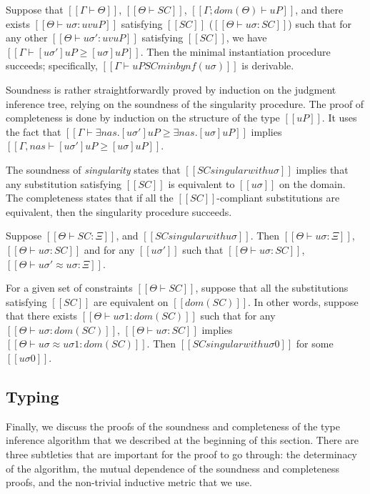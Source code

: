 \begin{lemma*}
    Suppose that $[[Γ ⊢ Θ]]$, $[[Θ ⊢ SC]]$, $[[Γ; dom(Θ) ⊢ uP]]$, and there exists 
    $[[Θ ⊢ uσ : uv uP ]]$ satisfying $[[SC]]$ ($[[Θ ⊢ uσ : SC]]$) 
    such that for any other $[[Θ ⊢ uσ' : uv uP ]]$
    satisfying $[[SC]]$, we have
    $[[Γ ⊢ [uσ']uP ≥ [uσ]uP ]]$.  Then the minimal instantiation procedure  
    succeeds; specifically, $[[Γ ⊢ uP SC minby nf(uσ) ]]$ is derivable.
\end{lemma*}

Soundness is rather straightforwardly proved by induction on the 
judgment inference tree, relying on the soundness of the singularity procedure.
The proof of completeness is done by induction on the structure of the type $[[uP]]$.
It uses the fact that $[[ Γ ⊢ ∃nas.[uσ']uP ≥ ∃nas.[uσ]uP]]$ implies
$[[ Γ, nas ⊢ [uσ']uP ≥ [uσ]uP]]$.

The soundness of \emph{singularity} states that $[[SC singular with uσ]]$
implies that any substitution satisfying $[[SC]]$ is equivalent to $[[uσ]]$ 
on the domain.  The completeness states that if all the 
$[[SC]]$-compliant substitutions are equivalent, then the singularity procedure succeeds. 

\begin{lemma*}
    \label{lemma:singularity-soundness}
    Suppose $[[Θ ⊢ SC : Ξ]]$, and $[[SC singular with uσ]]$. 
    Then $[[ Θ ⊢ uσ : Ξ ]]$,
     $[[ Θ ⊢ uσ : SC ]]$ and for any 
    $[[uσ']]$ such that $[[Θ ⊢ uσ : SC]]$,
    $[[Θ ⊢ uσ' ≈ uσ : Ξ]]$.
\end{lemma*}

\begin{lemma*}
    \label{lemma:singularity-completeness}
    For a given set of constraints $[[Θ ⊢ SC]]$,
    suppose that all the substitutions satisfying $[[SC]]$ are equivalent
    on $[[dom(SC)]]$.
    In other words, suppose that there exists $[[Θ ⊢ uσ1 : dom(SC)]]$ such that
    for any $[[Θ ⊢ uσ : dom(SC)]]$, $[[Θ ⊢ uσ : SC]]$ implies 
    $[[Θ ⊢ uσ ≈ uσ1 : dom(SC)]]$.
    Then $[[SC singular with uσ0]]$ for some $[[uσ0]]$.
\end{lemma*}

\subsection{Typing}

Finally, we discuss the proofs of the soundness and completeness of the type
inference algorithm that we described at the beginning of this section.
There are three subtleties that are important 
for the proof to go through: the determinacy of the algorithm,
the mutual dependence of the soundness and completeness proofs, and
the non-trivial inductive metric that we use.

